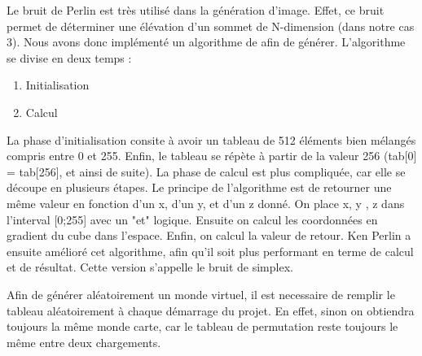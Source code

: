 ﻿Le bruit de Perlin est très utilisé dans la génération d'image. Effet, ce bruit permet de déterminer une élévation d'un sommet de N-dimension (dans notre cas 3). Nous avons donc implémenté un algorithme de afin de générer. L'algorithme se divise en deux temps :

\begin{enumerate}
	\item Initialisation
	\item Calcul
\end{enumerate}

La phase d'initialisation consite à avoir un tableau de 512 éléments bien mélangés compris entre 0 et 255. Enfin, le tableau se répète à partir de la valeur 256 (tab[0] = tab[256], et ainsi de suite). La phase de calcul est plus compliquée, car elle se découpe en plusieurs étapes. Le principe de l'algorithme est de retourner une même valeur en fonction d'un x, d'un y, et d'un z donné. On place x, y , z dans l'interval [0;255] avec un "et" logique. Ensuite on calcul les coordonnées en gradient du cube dans l'espace. Enfin, on calcul la valeur de retour. Ken Perlin a ensuite amélioré cet algorithme, afin qu'il soit plus performant en terme de calcul et de résultat. Cette version s'appelle le bruit de simplex.

Afin de générer aléatoirement un monde virtuel, il est necessaire de remplir le tableau aléatoirement à chaque démarrage du projet. En effet, sinon on obtiendra toujours la même monde carte, car le tableau de permutation reste toujours le même entre deux chargements.


